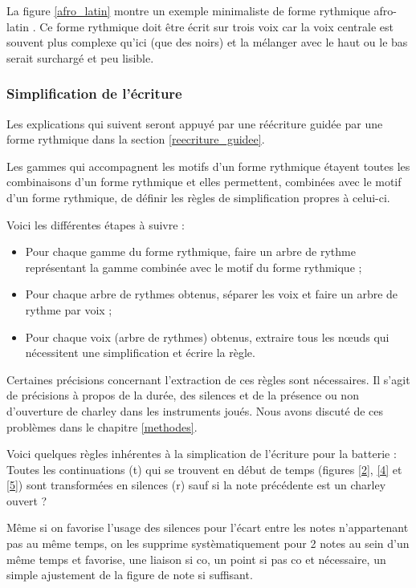 La figure \ref{afro_latin} montre un exemple minimaliste de forme rythmique afro-latin \cite{system_drums}. 
Ce forme rythmique doit être écrit sur trois voix car la voix centrale est souvent plus complexe qu’ici (que des noirs) et la mélanger avec le haut ou le bas serait surchargé et peu lisible.

\subsubsection{Simplification de l’écriture}
Les explications qui suivent seront appuyé par une réécriture guidée par une
forme rythmique dans la section \ref{reecriture_guidee}.

Les gammes qui accompagnent les motifs d’un forme rythmique étayent toutes les combinaisons d’un forme rythmique et elles permettent, combinées avec le motif d’un forme rythmique, de définir les règles de simplification propres à celui-ci.

Voici les différentes étapes à suivre :
\begin{itemize}
	\item Pour chaque gamme du forme rythmique, faire un arbre de rythme représentant la gamme combinée avec le motif du forme rythmique ;
	\item Pour chaque arbre de rythmes obtenus, séparer les voix et faire un arbre de rythme par voix ;
	\item Pour chaque voix (arbre de rythmes) obtenus, extraire tous les nœuds qui nécessitent une simplification et écrire la règle.
\end{itemize}

Certaines précisions concernant l’extraction de ces règles sont nécessaires. 
Il s’agit de précisions à propos de la durée, des silences et de la présence ou non d’ouverture de charley dans les instruments joués. 
Nous avons discuté de ces problèmes dans le chapitre \ref{methodes}.

Voici quelques règles inhérentes à la simplication de l’écriture pour la batterie :
Toutes les continuations (t) qui se trouvent en début de temps 
(figures \ref{2}, \ref{4} et \ref{5}) sont transformées en silences (r) sauf si la note précédente est un charley ouvert ?

Même si on favorise l’usage des silences pour l’écart entre les notes n’appartenant pas au même temps, on les supprime systèmatiquement pour 2 notes au sein d’un même temps et favorise, une liaison si co, un point si pas co et nécessaire, un simple ajustement de la figure de note si suffisant.

